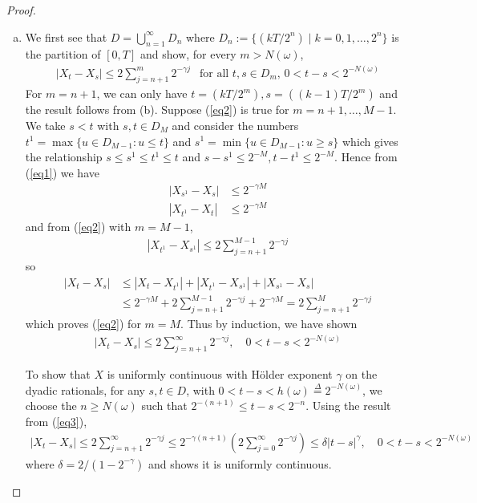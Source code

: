 \documentclass[a4paper,12pt]{article}
\theoremstyle{definition}
\begin{document}
\begin{proof}
\begin{enumerate}[(a)]
\item
We first see that $D = \bigcup_{n=1}^{\infty}D_n$ where $D_n:=\{(kT/2^n)\mid k=0,1,\ldots, 2^n\}$ is the partition of $[0,T]$ and show, for every $m>N(\omega)$, 
\begin{align}
|X_t - X_s| \leq 2 \sum_{j=n+1}^{m}2^{-\gamma j} ~~\text{ for all $t,s \in D_m$, }0 < t-s < 2^{-N(\omega)} \label{eq2}
\end{align}
For $m=n+1$, we can only have $t = (kT/2^m), s = ((k-1)T/2^m)$ and the result follows from (b). Suppose (\ref{eq2}) is true for $m = n+1, \ldots, M-1$. We take $s<t$ with $s,t \in D_{M}$ and consider the numbers $t^1 = \max \{u \in D_{M-1}: u \leq t\}$ and $s^1=\min\{u \in D_{M-1}:u \geq s\}$ which gives the relationship $s \leq s^1\leq t^1 \leq t$ and  $s-s^1 \leq 2^{-M},  t-t^1\leq 2^{-M}$. Hence from (\ref{eq1}) we have 
\begin{align*}
|X_{s^1}-X_s| &\leq 2^{-\gamma M}\\
|X_{t^1}-X_t| &\leq 2^{-\gamma M}
\end{align*}
and from (\ref{eq2}) with $m=M-1$, 
\begin{align*}
|X_{t^1}-X_{s^1}| \leq 2 \sum_{j=n+1}^{M-1}2^{-\gamma j}
\end{align*}
so
\begin{align*}
|X_t-X_s|&\leq |X_t-X_{t^1}|+|X_{t^1}-X_{s^1}|+|X_{s^1}-X_s|\\
&\leq 2^{-\gamma M} +2 \sum_{j=n+1}^{M-1}2^{-\gamma j} + 2^{-\gamma M}=2 \sum_{j=n+1}^{M}2^{-\gamma j}
\end{align*}
which proves (\ref{eq2}) for $m=M$. Thus by induction, we have shown
\begin{align}
|X_{t}-X_{s}| \leq 2 \sum_{j=n+1}^{\infty}2^{-\gamma j},\quad 0<t-s<2^{-N(\omega)}\label{eq3}
\end{align}



To show that $X$ is uniformly continuous with H\"{o}lder exponent $\gamma$ on the dyadic rationals, for any $s, t \in D$, with $0< t-s<h(\omega) \overset{\Delta}{=}2^{-N(\omega)}$, we choose the $n \geq N(\omega)$ such that $2^{-(n+1)}\leq t-s<2^{-n}$. Using the result from (\ref{eq3}),
\begin{align}
|X_t-X_s| \leq 2 \sum_{j=n+1}^{\infty}2^{-\gamma j}\leq 2^{-\gamma(n+1)}\left(2 \sum_{j=0}^{\infty}2^{-\gamma j}\right) \leq \delta |t-s|^\gamma, \quad 0<t-s<2^{-N(\omega)} \label{eq4}
\end{align}
where $\delta = 2/(1-2^{-\gamma})$ and shows it is uniformly continuous.







\end{enumerate}
\end{proof}
\end{document}
